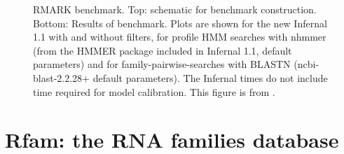 \documentclass[custom,landscape,final,30pt,plainboxedsections]{sciposter-titleskipsmall}
\begin{document}
\begin{multicols}{3}

\begin{footnotesize}
\begin{figure}
\caption{
RMARK benchmark. Top: schematic for benchmark
construction. Bottom: Results of benchmark. Plots are shown for the new
Infernal 1.1 with and without filters, for
profile HMM searches with nhmmer \cite{Wheeler13b} (from the HMMER package included in
Infernal 1.1, default parameters) and for family-pairwise-searches
with BLASTN (ncbi-blast-2.2.28+ default parameters). The Infernal
times do not include time required for model calibration. This figure
is from \cite{Nawrocki13c}.}
\label{fig:rmark}
\end{figure}
\end{footnotesize}

\vspace{0.5in}

\section*{Rfam: the RNA families database \cite{Nawrocki15}}


\end{multicols}
\end{document}

